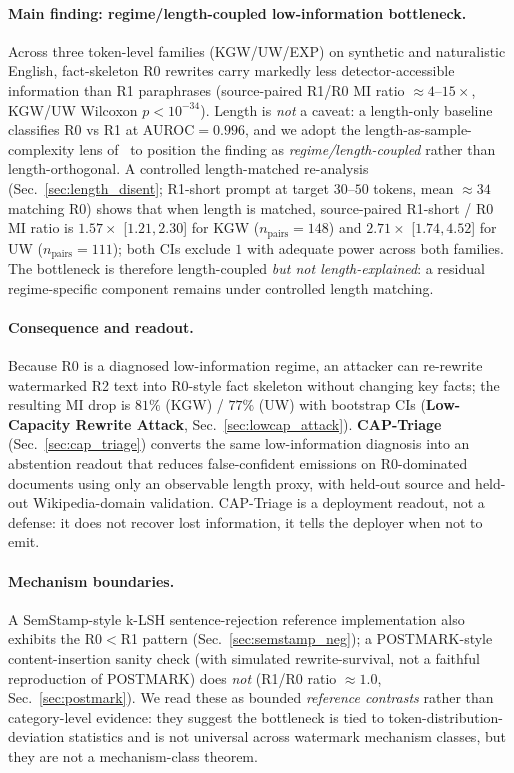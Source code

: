 \documentclass[11pt]{article}
\begin{document}
\paragraph{Main finding: regime/length-coupled low-information bottleneck.}
Across three token-level families (KGW/UW/EXP) on synthetic and
naturalistic English, fact-skeleton R0 rewrites carry markedly less
detector-accessible information than R1 paraphrases (source-paired R1/R0
MI ratio $\approx 4$--$15\times$, KGW/UW Wilcoxon $p<10^{-34}$). Length is
\emph{not} a caveat: a length-only baseline classifies R0 vs R1 at
AUROC$=0.996$, and we adopt the length-as-sample-complexity lens
of~\citet{kirchenbauer2024reliability} to position the finding as
\emph{regime/length-coupled} rather than length-orthogonal. A controlled
length-matched re-analysis (Sec.~\ref{sec:length_disent}; R1-short prompt
at target $30$--$50$ tokens, mean $\approx 34$ matching R0) shows that
when length is matched, source-paired R1-short / R0 MI ratio is
$1.57\times$ [$1.21, 2.30$] for KGW ($n_{\mathrm{pairs}}=148$) and
$2.71\times$ [$1.74, 4.52$] for UW ($n_{\mathrm{pairs}}=111$); both CIs
exclude $1$ with adequate power across both families. The bottleneck is
therefore length-coupled \emph{but not length-explained}: a residual
regime-specific component remains under controlled length matching.

\paragraph{Consequence and readout.}
Because R0 is a diagnosed low-information regime, an attacker can
re-rewrite watermarked R2 text into R0-style fact skeleton without changing
key facts; the resulting MI drop is $81\%$ (KGW) / $77\%$ (UW) with
bootstrap CIs (\textbf{Low-Capacity Rewrite Attack}, Sec.~\ref{sec:lowcap_attack}).
\textbf{CAP-Triage} (Sec.~\ref{sec:cap_triage}) converts the same
low-information diagnosis into an abstention readout that reduces
false-confident emissions on R0-dominated documents using only an
observable length proxy, with held-out source and held-out Wikipedia-domain
validation. CAP-Triage is a deployment readout, not a defense: it does not
recover lost information, it tells the deployer when not to emit.

\paragraph{Mechanism boundaries.}
A SemStamp-style k-LSH sentence-rejection reference implementation also
exhibits the R0$<$R1 pattern (Sec.~\ref{sec:semstamp_neg}); a POSTMARK-style
content-insertion sanity check (with simulated rewrite-survival, not a
faithful reproduction of POSTMARK) does \emph{not} (R1/R0 ratio
$\approx 1.0$, Sec.~\ref{sec:postmark}). We read these as bounded
\emph{reference contrasts} rather than category-level evidence: they
suggest the bottleneck is tied to token-distribution-deviation statistics
and is not universal across watermark mechanism classes, but they are not a
mechanism-class theorem.
\end{document}
